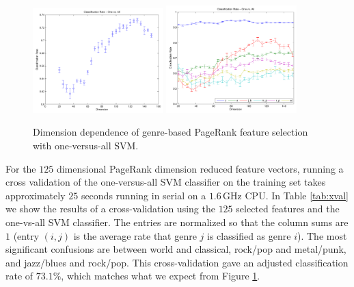 \documentclass[12pt]{article}
\begin{document}
\begin{figure}[h!]
   \centering
   \includegraphics[width=0.45\textwidth]{figures/optimSVMOVAprDim_genre05_Dale.pdf}
   \includegraphics[width=0.45\textwidth]{figures/optimSVMOVAprDimClass_Dale.pdf}
   \caption{Dimension dependence of genre-based PageRank feature selection with one-versus-all SVM.}
   \label{fig:prDim}
\end{figure}

For the $125$ dimensional PageRank dimension reduced feature vectors, running a cross validation of the one-versus-all SVM classifier on the training set takes approximately $25$ seconds running in serial on a $1.6\,\text{GHz}$ CPU.  In Table \ref{tab:xval} we show the results of a cross-validation using the $125$ selected features and the one-vs-all SVM classifier.  The entries are normalized so that the column sums are $1$ (entry $(i,j)$ is the average rate that genre $j$ is classified as genre $i$).  The most significant confusions are between world and classical, rock/pop and metal/punk, and jazz/blues and rock/pop.  This cross-validation gave an adjusted classification rate of $73.1\%$, which matches what we expect from Figure \ref{fig:prDim}.\\
\end{document}
